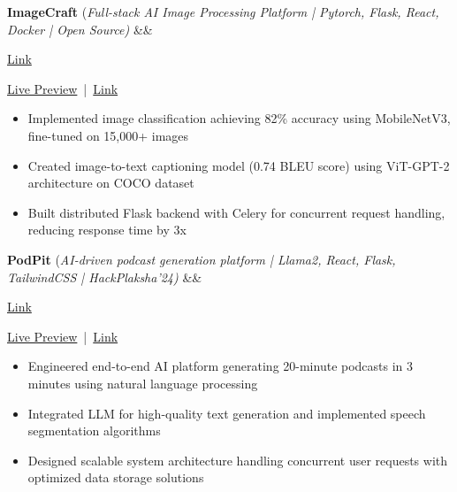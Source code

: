 \documentclass[a4paper]{article}
\newcommand{\bulletSep} { \vspace{1.5mm} }
\newcommand{\sectionSep} { \vspace{\stretch{1}} }
\newcommand{\lineunder} {
    \vspace*{-8pt} \\
    \hspace*{-15pt} \hrulefill \\
}
\newcommand{\header} [1] {
    {\hspace*{-18pt}\vspace*{6pt} {
        \fontfamily{qcs}\selectfont \large \scshape #1
    }}
    \vspace*{-6pt} \lineunder
    \vspace{1.1mm}
}
\newcommand{\volunteerItem}[5]{
    \textbf{#1} -- \textit{#2} \hfill #3 \\
    \begin{itemize}
        #4
    \end{itemize}
}
\newcommand{\linkFont}[1]{
    {\fontfamily{lmtt}\selectfont#1}
}
\newcommand{\link}[2]{
    {\fontfamily{lmtt}\selectfont\href{#1}{#2}}
}
\newcommand{\projectItem}[5]{
    {\textbf{#1}} {(\sl #2)}\hfill
    \ifx&#3&%
    \link{#4}{Link}\\
    \else
    \linkFont{\href{#3}{Live Preview}~|~\href{#4}{Link}}\\
    \fi
    \vspace{2pt}
    \begin{itemize}
        #5
    \end{itemize}
}
\begin{document}
\projectItem{ImageCraft}{Full-stack AI Image Processing Platform | Pytorch, Flask, React, Docker | Open Source}{}{https://image-craft-frontend.vercel.app/}{
    
    \item Implemented image classification achieving 82\% accuracy using MobileNetV3, fine-tuned on 15,000+ images
    \item Created image-to-text captioning model (0.74 BLEU score) using ViT-GPT-2 architecture on COCO dataset
    \item Built distributed Flask backend with Celery for concurrent request handling, reducing response time by 3x
}
\bulletSep


\projectItem{PodPit}{AI-driven podcast generation platform | Llama2, React, Flask, TailwindCSS | HackPlaksha’24}{}{https://devfolio.co/projects/podnews-1159}{
    \item Engineered end-to-end AI platform generating 20-minute podcasts in 3 minutes using natural language processing
    \item Integrated LLM for high-quality text generation and implemented speech segmentation algorithms
    \item Designed scalable system architecture handling concurrent user requests with optimized data storage solutions
}






\end{document}
